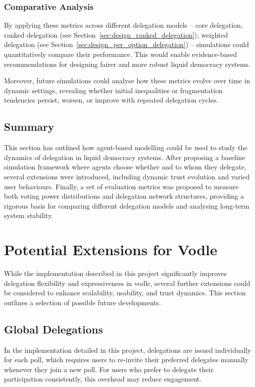 \subsubsection{Comparative Analysis}

By applying these metrics across different delegation models -- core delegation, ranked delegation (see Section~\ref{sec:design_ranked_delegation}), weighted delegation (see Section~\ref{sec:design_per_option_delegation}) -- simulations could quantitatively compare their performance. This would enable evidence-based recommendations for designing fairer and more robust liquid democracy systems.

Moreover, future simulations could analyse how these metrics evolve over time in dynamic settings, revealing whether initial inequalities or fragmentation tendencies persist, worsen, or improve with repeated delegation cycles.

\subsection{Summary}
This section has outlined how agent-based modelling could be used to study the dynamics of delegation in liquid democracy systems. After proposing a baseline simulation framework where agents choose whether and to whom they delegate, several extensions were introduced, including dynamic trust evolution and varied user behaviours. Finally, a set of evaluation metrics was proposed to measure both voting power distributions and delegation network structures, providing a rigorous basis for comparing different delegation models and analysing long-term system stability.

\section{Potential Extensions for Vodle}

While the implementation described in this project significantly improves delegation flexibility and expressiveness in vodle, several further extensions could be considered to enhance scalability, usability, and trust dynamics. This section outlines a selection of possible future developments.

\subsection{Global Delegations}

In the implementation detailed in this project, delegations are issued individually for each poll, which requires users to re-invite their preferred delegates manually whenever they join a new poll. For users who prefer to delegate their participation consistently, this overhead may reduce engagement.

